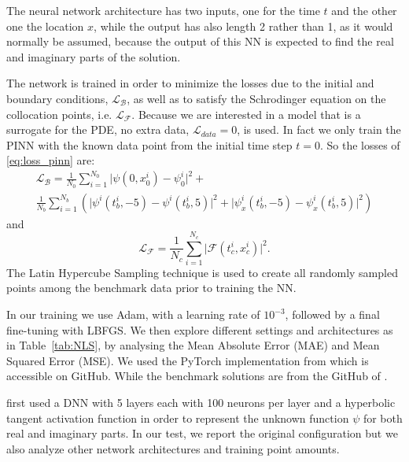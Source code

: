 \documentclass[pdflatex,sn-basic]{sn-jnl}%
\theoremstyle{thmstyleone}%
\theoremstyle{thmstyletwo}%
\theoremstyle{thmstylethree}%
\begin{document}
The neural network architecture has two inputs, one for the time $t$ and the other one the location $x$, while the output has also length 2 rather than 1, as it would normally be assumed, because the output of this NN is expected to find the real and imaginary parts of the solution.


The network is trained in order to minimize the losses due to the initial and boundary conditions, $\mathcal{L}_\mathcal{B}$,
as well as to satisfy the Schrodinger equation on the collocation points, i.e.  $\mathcal{L}_\mathcal{F}$.
Because we are interested in a model that is a surrogate for the PDE, no extra data, $\mathcal{L}_{data}=0$, is used.
In fact we only train the PINN with the known data point from the initial time step $t=0$.
So the losses of \eqref{eq:loss_pinn} are:
\begin{multline*}
\mathcal{L}_\mathcal{B}
= \frac{1}{N_0}\sum_{i=1}^{N_0} \lvert \psi(0,x_0^i) - \psi^i_0\rvert^2
+ \\
\frac{1}{N_b}\sum_{i=1}^{N_b} \left( \lvert \psi^i(t^i_b,-5) - \psi^i(t^i_b,5)\rvert^2 + \lvert \psi^i_x(t^i_b,-5) - \psi^i_x(t^i_b,5)\rvert^2 \right)
\end{multline*}
and
$$
\mathcal{L}_\mathcal{F} = \frac{1}{N_c}\sum_{i=1}^{N_c}\lvert \mathcal{F}(t_c^i,x_c^i)\rvert^2.
$$
%
The Latin Hypercube Sampling technique 
\citep{Stein1987LargeSP}
is used to create all randomly sampled points among the benchmark data prior to training the NN. 



In our training we use Adam, with a learning rate of $10^{-3}$, followed by a final  fine-tuning with LBFGS.
We then explore different settings and architectures as in Table~\ref{tab:NLS},
by analysing the  Mean Absolute Error (MAE) and Mean Squared Error (MSE).
We used  the PyTorch implementation from \cite{Sti2020_LargeScaleNeural_BetSBB} which is accessible on GitHub. While the benchmark solutions are from the GitHub of \cite{Rai2017_PhysicsInformedDeep1_PerRPK}.


\cite{Rai2017_PhysicsInformedDeep1_PerRPK}
first used a DNN with  5 layers each with 100 neurons per layer and a hyperbolic tangent activation function in order to represent the unknown function $\psi$ for both real and imaginary parts.
In our test, we report the original configuration but we also analyze other network architectures and training point amounts. 
\end{document}
